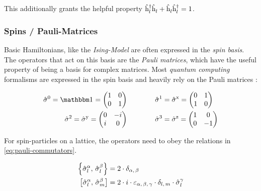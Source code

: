 This additionally grants the helpful property $\hat{\text{h}}^{\dagger }_{l}\hat{\text{h}}^{ }_{l} + \hat{\text{h}}^{ }_{l}\hat{\text{h}}^{\dagger }_{l}  = 1$.

\subsubsection*{Spins / Pauli-Matrices}

Basic Hamiltonians, like the \emph{Ising-Model} are often expressed in the \emph{spin basis}. 
The operators that act on this basis are the \emph{Pauli matrices}, which have the useful property of being a basis for complex matrices.
Most \emph{quantum computing} formalisms are expressed in the spin basis and heavily rely on the Pauli matrices \cite{quantumBookPaulisAndBasics}:

\begin{equation}
    \label{eq:pauli-matrices}
    \begin{split}
        \pauli{0} = \one = \left(\begin{matrix}
            1& 0 \\
            0& 1
        \end{matrix}\right) 
        \qquad & \qquad
        \pauli{1} = \pauli{x} = \left(\begin{matrix}
            0& 1 \\
            1& 0
        \end{matrix}\right) \\
        \pauli{2} = \pauli{y} = \left(\begin{matrix}
            0& -i \\
            i& 0
        \end{matrix}\right) 
        \qquad & \qquad
        \pauli{3} = \pauli{z} = \left(\begin{matrix}
            1& 0 \\
            0& -1
        \end{matrix}\right)
    \end{split}
\end{equation}

For spin-particles on a lattice, the operators need to obey the relations in \autoref{eq:pauli-commutators}.

\begin{equation}
    \label{eq:pauli-commutators}
    \begin{split}
        \left\{\pauli[l]{$\alpha$},\,\pauli[l]{$\beta$}\right\} &= 2 \cdot \delta_{\alpha,\,\beta}\\
        \left[\pauli[l]{$\alpha$},\,\pauli[m]{$\beta$}\right] &= 2 \cdot i \cdot \varepsilon_{\alpha,\,\beta,\,\gamma} \cdot \delta_{l,\,m}\cdot \pauli[l]{$\gamma$}
    \end{split}
\end{equation}

